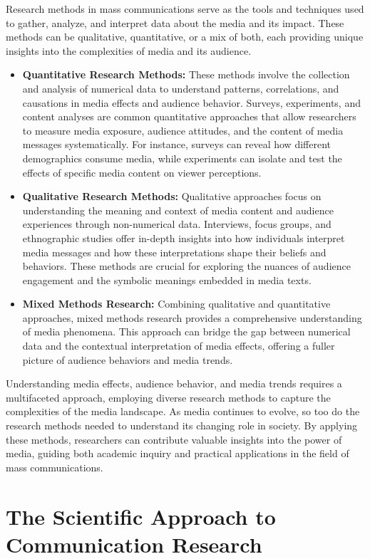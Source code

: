 \documentclass[
]{book}
\begin{document}
Research methods in mass communications serve as the tools and techniques used to gather, analyze, and interpret data about the media and its impact. These methods can be qualitative, quantitative, or a mix of both, each providing unique insights into the complexities of media and its audience.

\begin{itemize}
\item
  \textbf{Quantitative Research Methods:} These methods involve the collection and analysis of numerical data to understand patterns, correlations, and causations in media effects and audience behavior. Surveys, experiments, and content analyses are common quantitative approaches that allow researchers to measure media exposure, audience attitudes, and the content of media messages systematically. For instance, surveys can reveal how different demographics consume media, while experiments can isolate and test the effects of specific media content on viewer perceptions.
\item
  \textbf{Qualitative Research Methods:} Qualitative approaches focus on understanding the meaning and context of media content and audience experiences through non-numerical data. Interviews, focus groups, and ethnographic studies offer in-depth insights into how individuals interpret media messages and how these interpretations shape their beliefs and behaviors. These methods are crucial for exploring the nuances of audience engagement and the symbolic meanings embedded in media texts.
\item
  \textbf{Mixed Methods Research:} Combining qualitative and quantitative approaches, mixed methods research provides a comprehensive understanding of media phenomena. This approach can bridge the gap between numerical data and the contextual interpretation of media effects, offering a fuller picture of audience behaviors and media trends.
\end{itemize}

Understanding media effects, audience behavior, and media trends requires a multifaceted approach, employing diverse research methods to capture the complexities of the media landscape. As media continues to evolve, so too do the research methods needed to understand its changing role in society. By applying these methods, researchers can contribute valuable insights into the power of media, guiding both academic inquiry and practical applications in the field of mass communications.

\hypertarget{the-scientific-approach-to-communication-research}{%
\section{The Scientific Approach to Communication Research}\label{the-scientific-approach-to-communication-research}}
\end{document}
